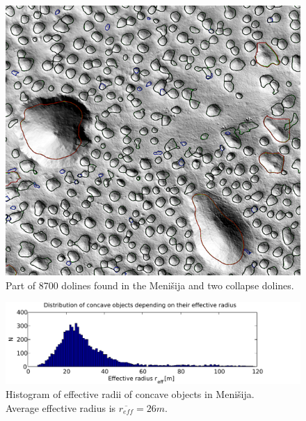 \documentclass[a0,portrait]{a0poster}
\begin{document}
\begin{multicols}{2}
  \begin{minipage}[b]{0.5\textwidth}
      \begin{minipage}{0.2\linewidth}
          \begin{figure}[H]
              \includegraphics[width=\textwidth]{menisija-vrtace}
              \caption{Part of 8700 dolines found in the Menišija and two collapse dolines.}
              \label{fig:vrtaceinpolmeri}
          \end{figure}
      \end{minipage}
      \begin{minipage}{0.83\linewidth}
          \begin{figure}[H]
              \captionsetup{margin=2cm}
              \includegraphics[width=\textwidth]{menisija-polmeri-hist-4}
              \caption{Histogram of effective radii of concave objects in Menišija. \\Average effective radius is $\overline{r_{eff}} = 26m$.}
              \label{fig:vrtave-histogram}
          \end{figure}
      \end{minipage}
  \end{minipage}


\end{multicols}
\end{document}
